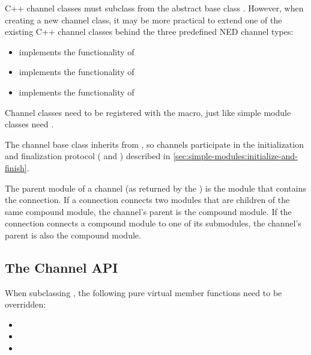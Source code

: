 \begin{ned}
C++ channel classes must subclass from the abstract base class
. However, when creating a new channel class, it may be
more practical to extend one of the existing C++ channel classes behind the
three predefined NED channel types:

\begin{itemize}
  \item {} implements the functionality of 
  \item {} implements the functionality of 
  \item {} implements the functionality of 
\end{itemize}

Channel classes need to be registered with the  macro,
just like simple module classes need .

The channel base class  inherits from ,
so channels participate in the initialization and finalization protocol
( and ) described in
\ref{sec:simple-modules:initialize-and-finish}.

The parent module of a channel (as returned by the
) is the module that contains
the connection. If a connection connects two modules that are children of
the same compound module, the channel's parent is the compound module. If
the connection connects a compound module to one of its submodules, the
channel's parent is also the compound module.


\subsection{The Channel API}
\label{sec:simple-modules:channel-api}

When subclassing , the following pure virtual member functions
need to be overridden:

\begin{itemize}
  \item {}
  \item {}
  \item {}
\end{itemize}


\end{ned}
